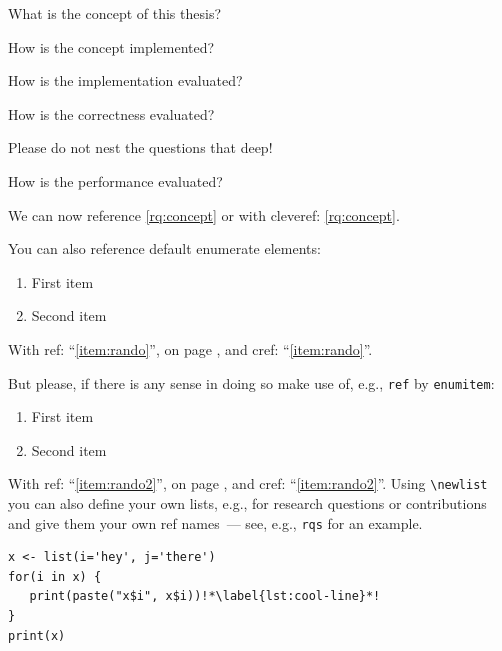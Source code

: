 \begin{rqs}
   \item \label{rq:concept} What is the concept of this thesis?
   \item \label{rq:implementation} How is the concept implemented?
   \item \label{rq:evaluation} How is the implementation evaluated?
   \begin{rqs}
      \item \label{rq:evaluation:correctness} How is the correctness evaluated? \begin{rqs}
         \item Please do not nest the questions that deep!
      \end{rqs}
      \item \label{rq:evaluation:performance} How is the performance evaluated?
   \end{rqs}
\end{rqs}

We can now reference \ref{rq:concept} or with cleveref: \cref{rq:concept}.

You can also reference default enumerate elements:

\begin{enumerate}
   \item \label{item:rando}First item
   \item Second item
\end{enumerate}

With ref: \enquote{\ref{item:rando}}, on page \pageref{item:rando}, and cref: \enquote{\cref{item:rando}}. 

But please, if there is any sense in doing so make use of, e.g., \texttt{ref} by \texttt{enumitem}:

\begin{enumerate}[ref={Penguin Element \arabic*}]
   \item \label{item:rando2}First item
   \item Second item
\end{enumerate}

With ref: \enquote{\ref{item:rando2}}, on page \pageref{item:rando2}, and cref: \enquote{\cref{item:rando2}}.
Using \texttt{\textbackslash newlist} you can also define your own lists, e.g., for research questions or contributions and give them your own ref names~--- see, e.g., \texttt{rqs} for an example.


\begin{verbatim}
x <- list(i='hey', j='there')
for(i in x) {
   print(paste("x$i", x$i))!*\label{lst:cool-line}*!
}
print(x)
\end{verbatim}

